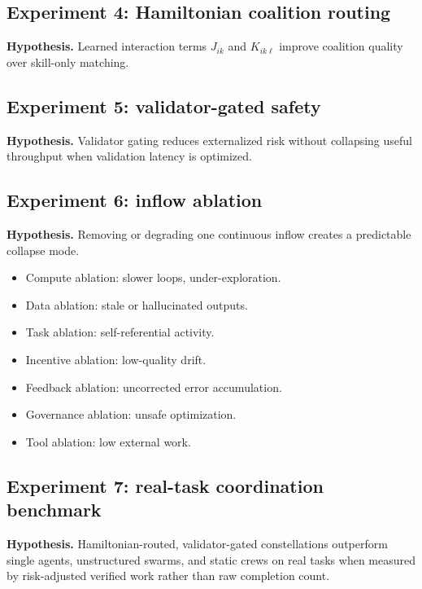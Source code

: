 \subsection{Experiment 4: Hamiltonian coalition
routing}\label{experiment-4-hamiltonian-coalition-routing}

\textbf{Hypothesis.} Learned interaction terms \(J_{ik}\) and
\(K_{ik\ell}\) improve coalition quality over skill-only matching.

\subsection{Experiment 5: validator-gated
safety}\label{experiment-5-validator-gated-safety}

\textbf{Hypothesis.} Validator gating reduces externalized risk without
collapsing useful throughput when validation latency is optimized.

\subsection{Experiment 6: inflow
ablation}\label{experiment-6-inflow-ablation}

\textbf{Hypothesis.} Removing or degrading one continuous inflow creates
a predictable collapse mode.

\begin{itemize}
\tightlist
\item
  Compute ablation: slower loops, under-exploration.
\item
  Data ablation: stale or hallucinated outputs.
\item
  Task ablation: self-referential activity.
\item
  Incentive ablation: low-quality drift.
\item
  Feedback ablation: uncorrected error accumulation.
\item
  Governance ablation: unsafe optimization.
\item
  Tool ablation: low external work.
\end{itemize}

\subsection{Experiment 7: real-task coordination
benchmark}\label{experiment-7-real-task-coordination-benchmark}

\textbf{Hypothesis.} Hamiltonian-routed, validator-gated constellations
outperform single agents, unstructured swarms, and static crews on real
tasks when measured by risk-adjusted verified work rather than raw
completion count.


